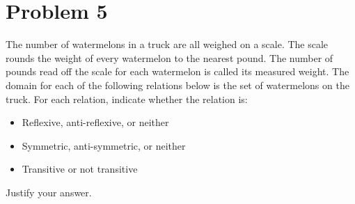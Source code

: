 \documentclass{amsart}
\theoremstyle{definition}
\theoremstyle{Exercise}
\theoremstyle{remark}
\theoremstyle{rule}
\numberwithin{equation}{section}
\begin{document}
\section*{Problem 5}

The number of watermelons in a truck are all weighed on a scale. The scale rounds the weight of every watermelon to the nearest pound. The number of pounds read off the scale for each watermelon is called its measured weight. The domain for each of the following relations below is the set of watermelons on the truck. For each relation, indicate whether the relation is:
\\
\begin{itemize}
  \item Reflexive, anti-reflexive, or neither
  \item Symmetric, anti-symmetric, or neither
  \item Transitive or not transitive
\end{itemize}
Justify your answer.\\
\end{document}
